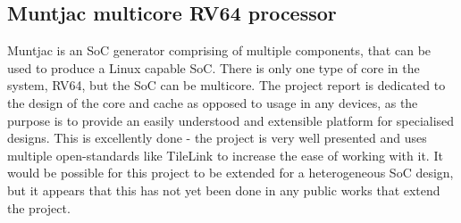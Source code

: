 \subsection{Muntjac multicore RV64 processor\cite{UCAM-CL-TR-972}}
Muntjac is an SoC generator comprising of multiple components, that can be used to produce a Linux capable SoC. There is only one type of core in the system, RV64, but the SoC can be multicore. The project report is dedicated to the design of the core and cache as opposed to usage in any devices, as the purpose is to provide an easily understood and extensible platform for specialised designs. This is excellently done - the project is very well presented and uses multiple open-standards like TileLink\cite{tilelink} to increase the ease of working with it. It would be possible for this project to be extended for a heterogeneous SoC design, but it appears that this has not yet been done in any public works that extend the project.
